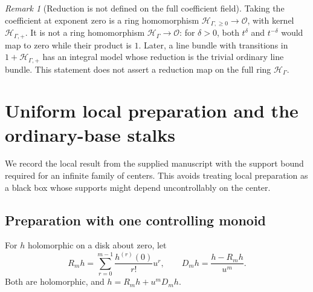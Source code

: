 \documentclass[11pt,letterpaper]{article}
\theoremstyle{definition}
\theoremstyle{remark}
\newtheorem{remark}[remark]{Remark}
\newcommand{\OO}{\mathcal O}
\newcommand{\HH}{\mathscr H_\Gamma}
\newcommand{\HP}{\mathscr H_{\Gamma,+}}
\newcommand{\HI}{\mathscr H_{\Gamma,\ge0}}
\numberwithin{equation}{section}
\begin{document}
\begin{remark}[Reduction is not defined on the full coefficient field]\label{rem:reduction}
Taking the coefficient at exponent zero is a ring homomorphism $\HI\to\OO$, with kernel $\HP$. It is not a ring homomorphism $\HH\to\OO$: for $\delta>0$, both $t^\delta$ and $t^{-\delta}$ would map to zero while their product is $1$. Later, a line bundle with transitions in $1+\HP$ has an integral model whose reduction is the trivial ordinary line bundle. This statement does not assert a reduction map on the full ring $\HH$.
\end{remark}

\section{Uniform local preparation and the ordinary-base stalks}\label{sec:stalks}
We record the local result from the supplied manuscript with the support bound required for an infinite family of centers. This avoids treating local preparation as a black box whose supports might depend uncontrollably on the center.

\subsection{Preparation with one controlling monoid}
For $h$ holomorphic on a disk about zero, let
\[
 R_mh=\sum_{r=0}^{m-1}\frac{h^{(r)}(0)}{r!}u^r,
 \qquad D_mh=\frac{h-R_mh}{u^m}.
\]
Both are holomorphic, and $h=R_mh+u^mD_mh$.
\end{document}
